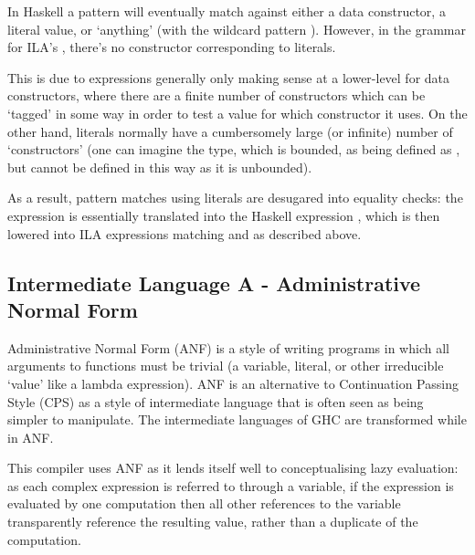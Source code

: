 \documentclass[dissertation.tex]{subfiles}
\begin{document}
{{{            In Haskell a pattern will eventually match against either a data constructor, a literal value, or
            `anything' (with the wildcard pattern \haskell{_}). However, in the grammar for ILA's
            , there's no constructor corresponding to literals.
            
            This is due to  expressions generally only making sense at a lower-level for data
            constructors, where there are a finite number of constructors which can be `tagged' in some way in order
            to test a value for which constructor it uses. On the other hand, literals normally have a cumbersomely
            large (or infinite) number of `constructors' (one can imagine the  type, which is bounded,
            as being defined as , but  cannot be
            defined in this way as it is unbounded).
            
            As a result, pattern matches using literals are desugared into equality checks: the expression
             is essentially translated into the Haskell expression
            , which is then lowered into ILA 
            expressions matching  and  as described above.

        }
    }
    \subsection{Intermediate Language A - Administrative Normal Form}
    {

        Administrative Normal Form\cite{ANF} (ANF) is a style of writing programs in which all arguments to
        functions must be trivial (a variable, literal, or other irreducible `value' like a lambda expression). ANF
        is an alternative to Continuation Passing Style (CPS) as a style of intermediate language that is often seen
        as being simpler to manipulate. The intermediate languages of GHC are transformed while in ANF.

        This compiler uses ANF as it lends itself well to conceptualising lazy evaluation: as each complex
        expression is referred to through a variable, if the expression is evaluated by one computation then all
        other references to the variable transparently reference the resulting value, rather than a duplicate of the
        computation.

}}
\end{document}
